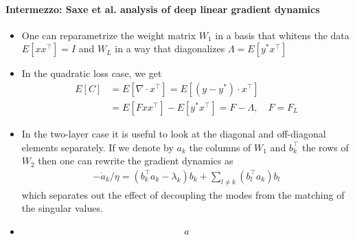 \documentclass{article}
\begin{document}
\paragraph{Intermezzo: Saxe et al. analysis of deep linear gradient dynamics}
\begin{itemize}
\item One can reparametrize the weight matrix $W_1$ in a basis that whitens  the data $E[xx^\top]=I$ and $W_L$ in a way that diagonalizes $\Lambda =E[y^* x^\top]$
\item In the quadratic loss case, we get 
\begin{align}
E[C] 
& = E[\nabla \cdot x^\top] = E[ (y - y^*) \cdot x^\top] \\
& = E[F x x^\top] - E[y^*x^\top] = F  - \Lambda, \quad F=F_L
\end{align}
\item  In the two-layer case it is useful to look at the diagonal and off-diagonal elements separately.  If we denote by $a_k$ the columns of $W_1$ and $b_k^\top$ the rows of $W_2$ then one can rewrite the gradient dynamics as 
\begin{align}
- \dot a_k/\eta = (b_k^\top a_k - \lambda_k) b_k + \sum_{l \neq k} (b_l^\top a_k) b_l
\end{align}
which separates out the effect of decoupling the modes from the matching of the singular values. 
\item
\begin{align}
a
\end{align}
\end{itemize}

\newpage
\end{document}
